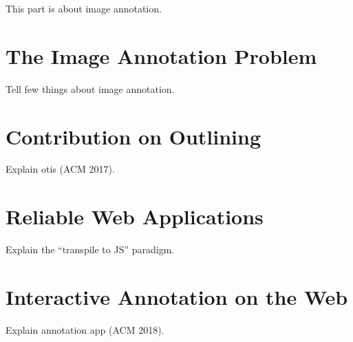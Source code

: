 This part is about image annotation.

\chapter{The Image Annotation Problem}%
\label{cha:the_image_annotation_problem}

Tell few things about image annotation.

\chapter{Contribution on Outlining}%
\label{cha:contribution_outlining}

Explain otis (ACM 2017).

\chapter{Reliable Web Applications}%
\label{cha:reliable_web_applications}

Explain the ``transpile to JS'' paradigm.

\chapter{Interactive Annotation on the Web}%
\label{cha:interactive_annotation_on_the_web}

Explain annotation app (ACM 2018).
